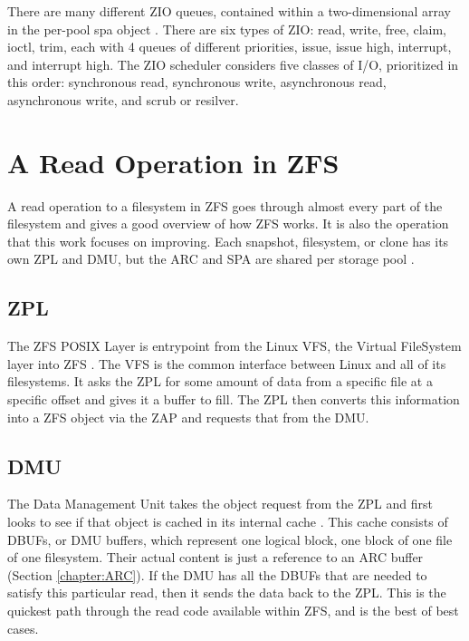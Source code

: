 There are many different ZIO queues, contained within a two-dimensional array in the per-pool spa object 
\cite[{module/zfs/spa.c}]{zfs}.
There are six  types of ZIO: read, write, free, claim, ioctl, trim, each with 4 queues of different priorities,
issue, issue high, interrupt, and interrupt high.
The ZIO scheduler considers five classes of I/O, prioritized in this order: synchronous read, synchronous write, asynchronous read, asynchronous write, and scrub or resilver.

\section{A Read Operation in ZFS}
A read operation to a filesystem in ZFS goes through almost every part of the filesystem and gives a good overview of how
ZFS works.
It is also the operation that this work focuses on improving.
Each snapshot, filesystem, or clone has its own ZPL and DMU, but the ARC and SPA are shared per storage pool 
\cite{ahrens_read_write}.

\subsection{ZPL}
The ZFS POSIX Layer is entrypoint from the Linux VFS, the Virtual FileSystem layer into ZFS \cite{ahrens_read_write,zfs}.
The VFS is the common interface between Linux and all of its filesystems.
It asks the ZPL for some amount of data from a specific file at a specific offset and gives it a buffer to fill.
The ZPL then converts this information into a ZFS object via the ZAP and requests that from the DMU.

\subsection{DMU}
The Data Management Unit takes the object request from the ZPL and first looks to see if that object is cached in its internal cache
\cite{ahrens_read_write,zfs}.
This cache consists of DBUFs, or DMU buffers, which represent one logical block, one block of one file of one filesystem.
Their actual content is just a reference to an ARC buffer (Section \ref{chapter:ARC}).
If the DMU has all the DBUFs that are needed to satisfy this particular read, then it sends the data back to the ZPL.
This is the quickest path through the read code available within ZFS, and is the best of best cases.

